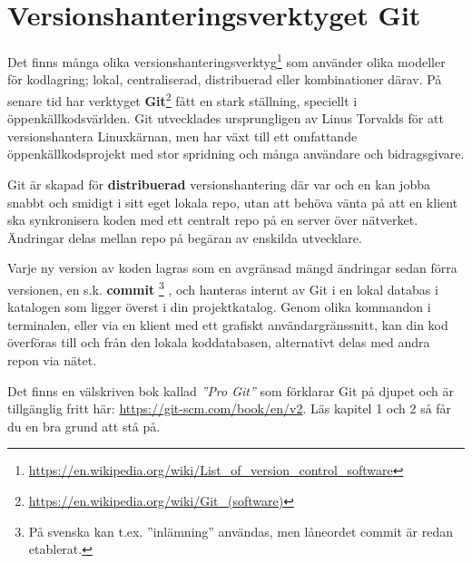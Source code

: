 \section{Versionshanteringsverktyget Git}

Det finns många olika versionshanteringsverktyg\footnote{\href{https://en.wikipedia.org/wiki/List_of_version_control_software}{https://en.wikipedia.org/wiki/List\_of\_version\_control\_software}}
 som använder olika modeller för kodlagring; lokal, centraliserad, distribuerad eller kombinationer därav. 
På senare tid har verktyget \textbf{Git}\footnote{\href{https://en.wikipedia.org/wiki/Git_(software)}{https://en.wikipedia.org/wiki/Git\_(software)}} fått en stark ställning, speciellt i öppenkällkodsvärlden. Git utvecklades ursprungligen av Linus Torvalds för att versionshantera Linuxkärnan, men har växt till ett omfattande öppenkällkodsprojekt med stor spridning och många användare och bidragsgivare. 

Git är skapad för \textbf{distribuerad} versionshantering där var och en kan jobba snabbt och smidigt i sitt eget lokala repo, utan att behöva vänta på att en klient ska synkronisera koden med ett centralt repo på en server över nätverket. Ändringar delas mellan repo på begäran av enskilda utvecklare. 

Varje ny version av koden lagras som en avgränsad mängd ändringar sedan förra versionen, en s.k. \textbf{commit}%
\footnote{På svenska kan t.ex. ''inlämning'' användas, men låneordet commit är redan etablerat.}%
, och hanteras internt av Git i en lokal databas i katalogen  som ligger överst i din projektkatalog. Genom olika kommandon i terminalen, eller via en klient med ett grafiskt användargränssnitt, kan din kod överföras till och från den lokala koddatabasen, alternativt delas med andra repon via nätet. 

Det finns en välskriven bok kallad \textit{''Pro Git''} som förklarar Git på djupet och är tillgänglig fritt här: 
\url{https://git-scm.com/book/en/v2}.
Läs kapitel 1 och 2 så får du en bra grund att stå på. 

